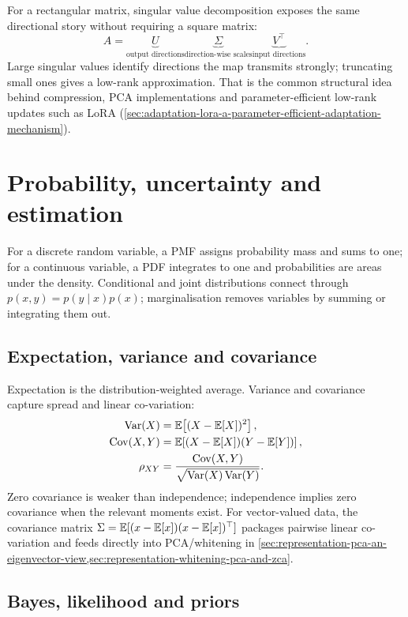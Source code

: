 For a rectangular matrix, singular value decomposition exposes the same directional story without requiring a square matrix:
\[
A
=
\underbrace{U}_{\text{output directions}}
\underbrace{\Sigma}_{\text{direction-wise scales}}
\underbrace{V^\top}_{\text{input directions}}.
\]
Large singular values identify directions the map transmits strongly; truncating small ones gives a low-rank approximation.
That is the common structural idea behind compression, PCA implementations and parameter-efficient low-rank updates such as LoRA (\cref{sec:adaptation-lora-a-parameter-efficient-adaptation-mechanism}).

\section{Probability, uncertainty and estimation}
\label{sec:foundations-pmfs-and-pdfs}

For a discrete random variable, a PMF assigns probability mass and sums to one; for a continuous variable, a PDF integrates to one and probabilities are areas under the density.
Conditional and joint distributions connect through $p(x,y)=p(y\mid x)p(x)$; marginalisation removes variables by summing or integrating them out.

\subsection{Expectation, variance and covariance}
\label{sec:foundations-expectation-variance-and-covariance}

Expectation is the distribution-weighted average.
Variance and covariance capture spread and linear co-variation:
\begin{align}
\operatorname{Var}(X)
&=\mathbb E\!\left[(X-\mathbb E[X])^2\right],\\
\operatorname{Cov}(X,Y)
&=\mathbb E\!\left[(X-\mathbb E[X])(Y-\mathbb E[Y])\right],\\
\rho_{XY}
&=\frac{\operatorname{Cov}(X,Y)}{\sqrt{\operatorname{Var}(X)\operatorname{Var}(Y)}}.
\end{align}
Zero covariance is weaker than independence; independence implies zero covariance when the relevant moments exist.
For vector-valued data, the covariance matrix $\Sigma=\mathbb E[(x-\mathbb E[x])(x-\mathbb E[x])^\top]$ packages pairwise linear co-variation and feeds directly into PCA/whitening in \cref{sec:representation-pca-an-eigenvector-view,sec:representation-whitening-pca-and-zca}.


\subsection{Bayes, likelihood and priors}
\label{sec:foundations-bayes-theorem}

